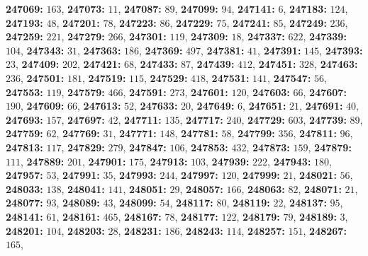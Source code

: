 \textsf{\bfseries 247069:} $163$, \textsf{\bfseries 247073:} $11$, \textsf{\bfseries 247087:} $89$, \textsf{\bfseries 247099:} $94$, \textsf{\bfseries 247141:} $6$, \textsf{\bfseries 247183:} $124$, \textsf{\bfseries 247193:} $48$, \textsf{\bfseries 247201:} $78$, \textsf{\bfseries 247223:} $86$, \textsf{\bfseries 247229:} $75$, \textsf{\bfseries 247241:} $85$, \textsf{\bfseries 247249:} $236$, \textsf{\bfseries 247259:} $221$, \textsf{\bfseries 247279:} $266$, \textsf{\bfseries 247301:} $119$, \textsf{\bfseries 247309:} $18$, \textsf{\bfseries 247337:} $622$, \textsf{\bfseries 247339:} $104$, \textsf{\bfseries 247343:} $31$, \textsf{\bfseries 247363:} $186$, \textsf{\bfseries 247369:} $497$, \textsf{\bfseries 247381:} $41$, \textsf{\bfseries 247391:} $145$, \textsf{\bfseries 247393:} $23$, \textsf{\bfseries 247409:} $202$, \textsf{\bfseries 247421:} $68$, \textsf{\bfseries 247433:} $87$, \textsf{\bfseries 247439:} $412$, \textsf{\bfseries 247451:} $328$, \textsf{\bfseries 247463:} $236$, \textsf{\bfseries 247501:} $181$, \textsf{\bfseries 247519:} $115$, \textsf{\bfseries 247529:} $418$, \textsf{\bfseries 247531:} $141$, \textsf{\bfseries 247547:} $56$, \textsf{\bfseries 247553:} $119$, \textsf{\bfseries 247579:} $466$, \textsf{\bfseries 247591:} $273$, \textsf{\bfseries 247601:} $120$, \textsf{\bfseries 247603:} $66$, \textsf{\bfseries 247607:} $190$, \textsf{\bfseries 247609:} $66$, \textsf{\bfseries 247613:} $52$, \textsf{\bfseries 247633:} $20$, \textsf{\bfseries 247649:} $6$, \textsf{\bfseries 247651:} $21$, \textsf{\bfseries 247691:} $40$, \textsf{\bfseries 247693:} $157$, \textsf{\bfseries 247697:} $42$, \textsf{\bfseries 247711:} $135$, \textsf{\bfseries 247717:} $240$, \textsf{\bfseries 247729:} $603$, \textsf{\bfseries 247739:} $89$, \textsf{\bfseries 247759:} $62$, \textsf{\bfseries 247769:} $31$, \textsf{\bfseries 247771:} $148$, \textsf{\bfseries 247781:} $58$, \textsf{\bfseries 247799:} $356$, \textsf{\bfseries 247811:} $96$, \textsf{\bfseries 247813:} $117$, \textsf{\bfseries 247829:} $279$, \textsf{\bfseries 247847:} $106$, \textsf{\bfseries 247853:} $432$, \textsf{\bfseries 247873:} $159$, \textsf{\bfseries 247879:} $111$, \textsf{\bfseries 247889:} $201$, \textsf{\bfseries 247901:} $175$, \textsf{\bfseries 247913:} $103$, \textsf{\bfseries 247939:} $222$, \textsf{\bfseries 247943:} $180$, \textsf{\bfseries 247957:} $53$, \textsf{\bfseries 247991:} $35$, \textsf{\bfseries 247993:} $244$, \textsf{\bfseries 247997:} $120$, \textsf{\bfseries 247999:} $21$, \textsf{\bfseries 248021:} $56$, \textsf{\bfseries 248033:} $138$, \textsf{\bfseries 248041:} $141$, \textsf{\bfseries 248051:} $29$, \textsf{\bfseries 248057:} $166$, \textsf{\bfseries 248063:} $82$, \textsf{\bfseries 248071:} $21$, \textsf{\bfseries 248077:} $93$, \textsf{\bfseries 248089:} $43$, \textsf{\bfseries 248099:} $54$, \textsf{\bfseries 248117:} $80$, \textsf{\bfseries 248119:} $22$, \textsf{\bfseries 248137:} $95$, \textsf{\bfseries 248141:} $61$, \textsf{\bfseries 248161:} $465$, \textsf{\bfseries 248167:} $78$, \textsf{\bfseries 248177:} $122$, \textsf{\bfseries 248179:} $79$, \textsf{\bfseries 248189:} $3$, \textsf{\bfseries 248201:} $104$, \textsf{\bfseries 248203:} $28$, \textsf{\bfseries 248231:} $186$, \textsf{\bfseries 248243:} $114$, \textsf{\bfseries 248257:} $151$, \textsf{\bfseries 248267:} $165$, 
